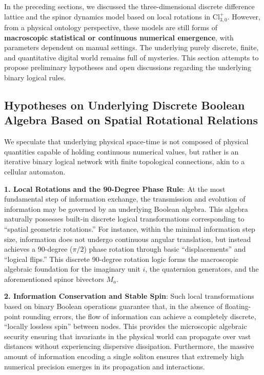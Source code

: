 \documentclass[12pt, a4paper]{article}
\begin{document}
In the preceding sections, we discussed the three-dimensional discrete difference lattice and the spinor dynamics model based on local rotations in $\text{Cl}_{3,0}^+$. However, from a physical ontology perspective, these models are still forms of \textbf{macroscopic statistical or continuous numerical emergence}, with parameters dependent on manual settings. The underlying purely discrete, finite, and quantitative digital world remains full of mysteries. This section attempts to propose preliminary hypotheses and open discussions regarding the underlying binary logical rules.

\subsection{Hypotheses on Underlying Discrete Boolean Algebra Based on Spatial Rotational Relations}

We speculate that underlying physical space-time is not composed of physical quantities capable of holding continuous numerical values, but rather is an iterative binary logical network with finite topological connections, akin to a cellular automaton.

\textbf{1. Local Rotations and the 90-Degree Phase Rule}: At the most fundamental step of information exchange, the transmission and evolution of information may be governed by an underlying Boolean algebra. This algebra naturally possesses built-in discrete logical transformations corresponding to ``spatial geometric rotations.'' For instance, within the minimal information step size, information does not undergo continuous angular translation, but instead achieves a 90-degree ($\pi/2$) phase rotation through basic ``displacements'' and ``logical flips.'' This discrete 90-degree rotation logic forms the macroscopic algebraic foundation for the imaginary unit $i$, the quaternion generators, and the aforementioned spinor bivectors $M_a$.

\textbf{2. Information Conservation and Stable Spin}: Such local transformations based on binary Boolean operations guarantee that, in the absence of floating-point rounding errors, the flow of information can achieve a completely discrete, ``locally lossless spin'' between nodes. This provides the microscopic algebraic security ensuring that invariants in the physical world can propagate over vast distances without experiencing dispersive dissipation. Furthermore, the massive amount of information encoding a single soliton ensures that extremely high numerical precision emerges in its propagation and interactions.
\end{document}
